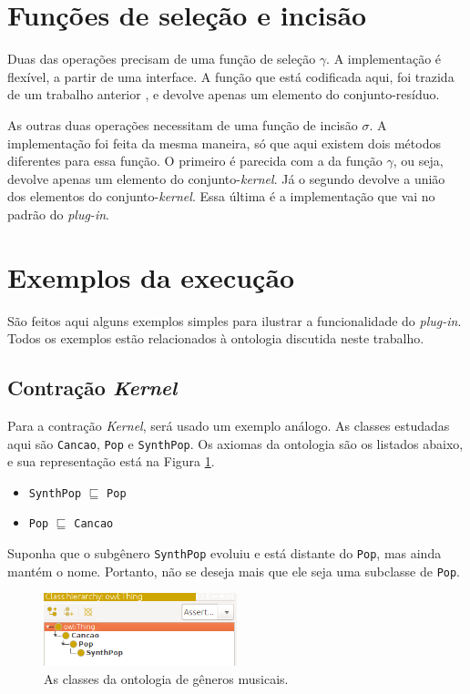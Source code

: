 \section{Funções de seleção e incisão}

Duas das operações precisam de uma função de seleção $ \gamma $. A implementação é flexível, a partir de uma interface. A função que está codificada aqui, foi trazida de um trabalho anterior \citep{logicaMatos}, e devolve apenas um elemento do conjunto-resíduo.

As outras duas operações necessitam de uma função de incisão $ \sigma $. A implementação foi feita da mesma maneira, só que aqui existem dois métodos diferentes para essa função. O primeiro é parecida com a da função $ \gamma $, ou seja, devolve apenas um elemento do conjunto-\textit{kernel}. Já o segundo devolve a união dos elementos do conjunto-\textit{kernel}. Essa última é a im\-ple\-men\-ta\-ção que vai no padrão do \textit{plug-in}.

\section{Exemplos da execução}

São feitos aqui alguns exemplos simples para ilustrar a funcionalidade do \textit{plug-in}. Todos os exemplos estão relacionados à ontologia discutida neste trabalho.

\subsection{Contração \textit{Kernel}}

Para a contração \textit{Kernel}, será usado um exemplo análogo. As classes estudadas aqui são \texttt{Cancao}, \texttt{Pop} e \texttt{SynthPop}. Os axiomas da ontologia são os listados abaixo, e sua representação está na Figura \ref{img:ck1}.

\begin{itemize}
	\item \texttt{SynthPop} $ \sqsubseteq $ \texttt{Pop}
	\item \texttt{Pop} $ \sqsubseteq $ \texttt{Cancao}
\end{itemize}

Suponha que o subgênero \texttt{SynthPop} evoluiu e está distante do \texttt{Pop}, mas ainda mantém o nome. Portanto, não se deseja mais que ele seja uma subclasse de \texttt{Pop}.

\begin{figure}[H]
	\centering
	\includegraphics[width=0.5\textwidth]{Capitulos/Implementacao/ck1.png}
	\caption{As classes da ontologia de gêneros musicais.}
	\label{img:ck1}
\end{figure}

